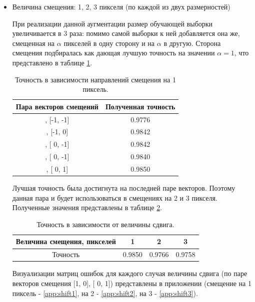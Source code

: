 \documentclass{article}
\begin{document}
\begin{itemize}
    \item Величина смещения: 1, 2, 3 пикселя (по каждой из двух размерностей)
    
    При реализации данной аугментации размер обучающей выборки увеличивается в 3 раза: помимо самой выборки к ней добавляется она же, смещенная на $\alpha$ пикселей в одну сторону и на $\alpha$ в другую. Сторона смещения подбиралась как дающая лучшую точность на значении $\alpha=1$, что представлено в таблице \ref{tab:widgets5}.
       
    \begin{table}[H]
    \begin{center}
    \begin{tabular}{|*{2}{c|}}\hline
    Пара векторов смещений & Полученная точность \\\hline
    [1, 1],  [-1, -1] &  0.9776 \\\hline
    [1, 0],  [-1,  0] &  0.9842 \\\hline
    [1, 0],  [ 0, -1] &  0.9842 \\\hline
    [0, 1],  [ 0, -1] &  0.9840 \\\hline
    [1, 0],  [ 0,  1] &  0.9850 \\\hline
    \end{tabular}
    \caption{\label{tab:widgets5} Точность в зависимости направлений смещения на 1 пиксель.}
    \end{center}
    \end{table}
    Лучшая точность была достигнута на последней паре векторов. Поэтому данная пара и будет использоваться в смещениях на 2 и 3 пикселя. Полученные значения представлены в таблице \ref{tab:widgets6}.
    
    \begin{table}[H]
    \begin{center}
    \begin{tabular}{|*{4}{c|}}\hline
    Величина смещения, пикселей & 1 & 2 & 3\\\hline
    Точность &  0.9850 &  0.9766 & 0.9758 \\\hline
    \end{tabular}
    \caption{\label{tab:widgets6} Точность в зависимости от величины сдвига.}
    \end{center}
    \end{table}

    Визуализации матриц ошибок для каждого случая величины сдвига (по паре векторов смещения [1, 0],  [ 0,  1]) представлены в приложении (смещение на 1 пиксель - \ref{app:shift1}, на 2 - \ref{app:shift2}, на 3 - \ref{app:shift3}).
    

\end{itemize}
\end{document}
